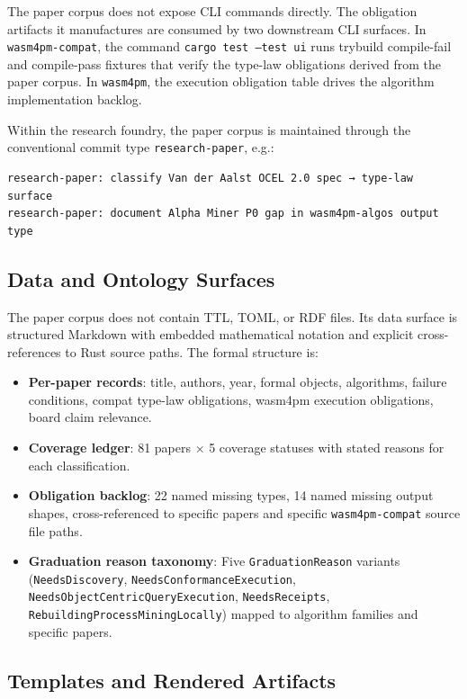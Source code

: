 The paper corpus does not expose CLI commands directly. The obligation artifacts
it manufactures are consumed by two downstream CLI surfaces. In
\texttt{wasm4pm-compat}, the command \texttt{cargo test --test ui} runs
trybuild compile-fail and compile-pass fixtures that verify the type-law
obligations derived from the paper corpus. In \texttt{wasm4pm}, the execution
obligation table drives the algorithm implementation backlog.

Within the research foundry, the paper corpus is maintained through the
conventional commit type \texttt{research-paper}, e.g.:
\begin{verbatim}
research-paper: classify Van der Aalst OCEL 2.0 spec → type-law surface
research-paper: document Alpha Miner P0 gap in wasm4pm-algos output type
\end{verbatim}

\subsection{Data and Ontology Surfaces}
\label{sec:sources-papers-impl-data}

The paper corpus does not contain TTL, TOML, or RDF files. Its data surface
is structured Markdown with embedded mathematical notation and explicit
cross-references to Rust source paths. The formal structure is:

\begin{itemize}
  \item \textbf{Per-paper records}: title, authors, year, formal objects,
    algorithms, failure conditions, compat type-law obligations, wasm4pm
    execution obligations, board claim relevance.
  \item \textbf{Coverage ledger}: 81 papers $\times$ 5 coverage statuses with
    stated reasons for each classification.
  \item \textbf{Obligation backlog}: 22 named missing types, 14 named missing
    output shapes, cross-referenced to specific papers and specific
    \texttt{wasm4pm-compat} source file paths.
  \item \textbf{Graduation reason taxonomy}: Five \texttt{GraduationReason}
    variants (\texttt{NeedsDiscovery}, \texttt{NeedsConformanceExecution},
    \texttt{NeedsObjectCentricQueryExecution}, \texttt{NeedsReceipts},
    \texttt{RebuildingProcessMiningLocally}) mapped to algorithm families and
    specific papers.
\end{itemize}

\subsection{Templates and Rendered Artifacts}
\label{sec:sources-papers-impl-templates}

